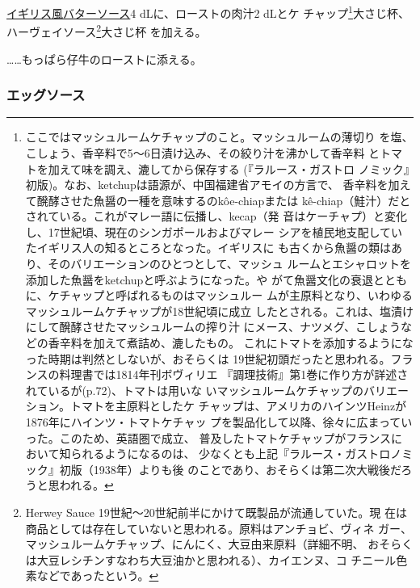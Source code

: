 \begin{recette}
\protect\hyperlink{butter-sauce}{イギリス風バターソース}4
dLに、ローストの肉汁2 dLとケ チャップ\footnote{ここではマッシュルームケチャップのこと。マッシュルームの薄切り
  を塩、こしょう、香辛料で5〜6日漬け込み、その絞り汁を沸かして香辛料
  とトマトを加えて味を調え、漉してから保存する (『ラルース・ガストロ
  ノミック』初版)。なお、ketchupは語源が、中国福建省アモイの方言で、
  香辛料を加えて醗酵させた魚醤の一種を意味するのkôe-chiapまたは
  kê-chiap（鮭汁）だとされている。これがマレー語に伝播し、kecap（発
  音はケーチャプ）と変化し、17世紀頃、現在のシンガポールおよびマレー
  シアを植民地支配していたイギリス人の知るところとなった。イギリスに
  も古くから魚醤の類はあり、そのバリエーションのひとつとして、マッシュ
  ルームとエシャロットを添加した魚醤をketchupと呼ぶようになった。や
  がて魚醤文化の衰退とともに、ケチャップと呼ばれるものはマッシュルー
  ムが主原料となり、いわゆるマッシュルームケチャップが18世紀頃に成立
  したとされる。これは、塩漬けにして醗酵させたマッシュルームの搾り汁
  にメース、ナツメグ、こしょうなどの香辛料を加えて煮詰め、漉したもの。
  これにトマトを添加するようになった時期は判然としないが、おそらくは
  19世紀初頭だったと思われる。フランスの料理書では1814年刊ボヴィリエ
  『調理技術』第1巻に作り方が詳述されているが(p.72)、トマトは用いな
  いマッシュルームケチャップのバリエーション。トマトを主原料としたケ
  チャップは、アメリカのハインツHeinzが1876年にハインツ・トマトケチャッ
  プを製品化して以降、徐々に広まっていった。このため、英語圏で成立、
  普及したトマトケチャップがフランスにおいて知られるようになるのは、
  少なくとも上記『ラルース・ガストロノミック』初版（1938年）よりも後
  のことであり、おそらくは第二次大戦後だろうと思われる。}大さじ\undemi{}杯、ハーヴェイソース\footnote{Herwey
  Sauce 19世紀〜20世紀前半にかけて既製品が流通していた。現
  在は商品としては存在していないと思われる。原料はアンチョビ、ヴィネ
  ガー、マッシュルームケチャップ、にんにく、大豆由来原料（詳細不明、
  おそらくは大豆レシチンすなわち大豆油かと思われる）、カイエンヌ、コ
  チニール色素などであったという。}大さじ\undemi{}杯 を加える。

\ldots{}\ldots{}もっぱら仔牛のローストに添える。

\hypertarget{eggs-sauce}{%
\subsubsection{エッグソース}\label{eggs-sauce}}



\end{recette}
